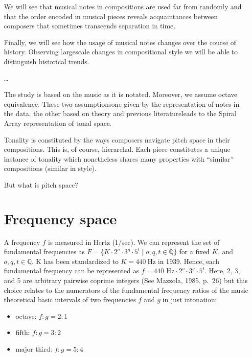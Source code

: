 \documentclass[letterpaper,10pt,english]{sphinxmanual}
\begin{document}
\sphinxAtStartPar
We will see that musical notes in compositions are used far from
randomly and that the order encoded in musical pieces reveals
acquaintances between composers that sometimes transcends separation in
time.

\sphinxAtStartPar
Finally, we will see how the usage of musical notes changes over the
course of history. Observing large\sphinxhyphen{}scale changes in compositional style
we will be able to distinguish historical trends.

\sphinxAtStartPar
…

\sphinxAtStartPar
The study is based on the music as it is notated. Moreover, we assume
octave equivalence. These two assumptions\textendash{}one given by the
representation of notes in the data, the other based on theory and
previous literature\textendash{}leads to the Spiral Array representation of tonal
space.

\sphinxAtStartPar
Tonality is constituted by the ways composers navigate pitch space in
their compositions. This is, of course, hierarchal. Each piece
constitutes a unique instance of tonality which nonetheless shares many
properties with “similar” compositions (similar in style).

\sphinxAtStartPar
But what is pitch space?


\section{Frequency space}
\label{\detokenize{5_notes:frequency-space}}
\sphinxAtStartPar
A frequency \(f\) is measured in Hertz (1/sec). We can represent the
set of fundamental frequencies as
\(F=\{ K \cdot 2^o \cdot 3^q \cdot 5^t\mid o, q, t \in \mathbb Q \}\)
for a fixed  \(K\), and \(o, q, t\in \mathbb Q\). K
has been standardized to \(K=440~\text{Hz}\) in 1939. Hence, each
fundamental frequency can be represented as
\(f=440 \text{ Hz} \cdot 2^o \cdot 3^q \cdot 5^t\). Here, 2, 3, and
5 are arbitrary pairwise coprime integers (See Mazzola, 1985, p. 26) but
this choice relates to the numerators of the fundamental frequency
ratios of the music theoretical basic intervals of two frequencies
\(f\) and \(g\) in just intonation:
\begin{itemize}
\item {} 
\sphinxAtStartPar
octave: \(f:g = 2:1\)

\item {} 
\sphinxAtStartPar
fifth: \(f:g=3:2\)

\item {} 
\sphinxAtStartPar
major third: \(f:g = 5:4\)

\end{itemize}
\end{document}
